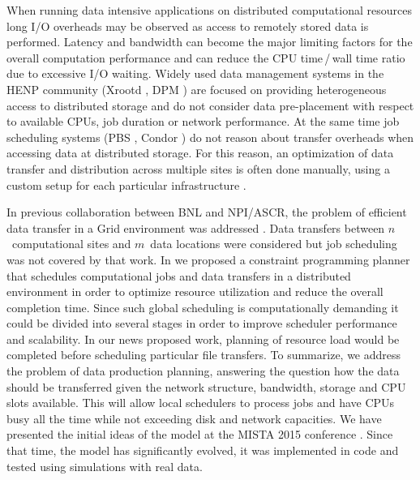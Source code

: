 \documentclass{svjour3}                     %
\begin{document}
When running data intensive applications on distributed computational
resources long I/O overheads may be observed as access to remotely stored data
is performed. Latency and bandwidth can become the major limiting factors for
the overall computation performance and can reduce the CPU time\,/\,wall time 
ratio due to excessive I/O waiting. 
Widely used data management systems in the HENP community
(Xrootd \cite{Xrootd}, DPM \cite{DPM}) are focused on providing heterogeneous access to distributed
storage and do not consider data pre-placement with respect to available CPUs,
job duration or network performance. At the same time job scheduling systems
(PBS \cite{PBS}, Condor \cite{Torque}) do not reason about transfer overheads when accessing data at
distributed storage. For this reason, an optimization of data transfer and
distribution across multiple sites is often done manually, using a custom
setup for each particular infrastructure \cite{Balewski}. 

In previous collaboration between BNL and NPI/ASCR, the problem of
efficient data transfer in a Grid environment was addressed \cite{Zerola}.
Data transfers between $n$~computational sites and $m$~data locations were
considered but job scheduling was not covered
by that work. In \cite{ACAT_cp} we
proposed a constraint programming planner that schedules computational jobs
and data transfers in a distributed environment in order to optimize resource
utilization and reduce the overall completion time. Since such global
scheduling is computationally demanding it could be divided into several
stages in order to improve scheduler performance and scalability. In our news proposed work, planning of resource load would be completed before scheduling particular file transfers. To summarize, we address the problem of data production
planning, answering the question how the data should be transferred given the
network structure, bandwidth, storage and CPU slots available. This will allow
local schedulers to process jobs and have CPUs busy all the time while not
exceeding disk and network capacities. 
We have presented the initial ideas of the model at the MISTA 2015 conference \cite{MISTA}. Since that time, the model has significantly evolved, it was implemented in code and tested using simulations with real data. 
\end{document}
